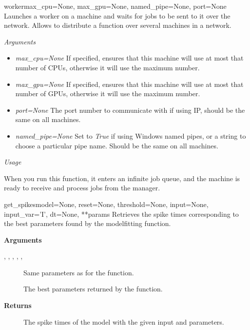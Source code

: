 \documentclass[letterpaper,10pt,english]{manual}
\begin{document}
\hypertarget{brian.library.modelfitting.worker}{}\begin{funcdesc}{worker}{max\_cpu=None, max\_gpu=None, named\_pipe=None, port=None}
Launches a worker on a machine and waits for jobs to be sent to it over the network.
Allows to distribute a function over several machines in a network.

\emph{Arguments}
\begin{itemize}
\item {} 
\emph{max\_cpu=None}
If specified, ensures that this machine will use at most that number of
CPUs, otherwise it will use the maximum number.

\item {} 
\emph{max\_gpu=None}
If specified, ensures that this machine will use at most that number of
GPUs, otherwise it will use the maximum number.

\item {} 
\emph{port=None}
The port number to communicate with if using IP, should be the same on
all machines.

\item {} 
\emph{named\_pipe=None}
Set to \emph{True} if using Windows named pipes, or a string to choose a
particular pipe name. Should be the same on all machines.

\end{itemize}

\emph{Usage}

When you run this function, it enters an infinite job queue, and the machine
is ready to receive  and process jobs from the manager.
\end{funcdesc}

\hypertarget{brian.library.modelfitting.get_spikes}{}\begin{funcdesc}{get\_spikes}{model=None, reset=None, threshold=None, input=None, input\_var='I', dt=None, **params}
Retrieves the spike times corresponding to the best parameters found by
the modelfitting function.

\textbf{Arguments}
\begin{description}
\item[, , , , , ] \leavevmode
Same parameters as for the  function.

\item[] \leavevmode
The best parameters returned by the  function.

\end{description}

\textbf{Returns}
\begin{description}
\item[] \leavevmode
The spike times of the model with the given input and parameters.

\end{description}
\end{funcdesc}
\end{document}
